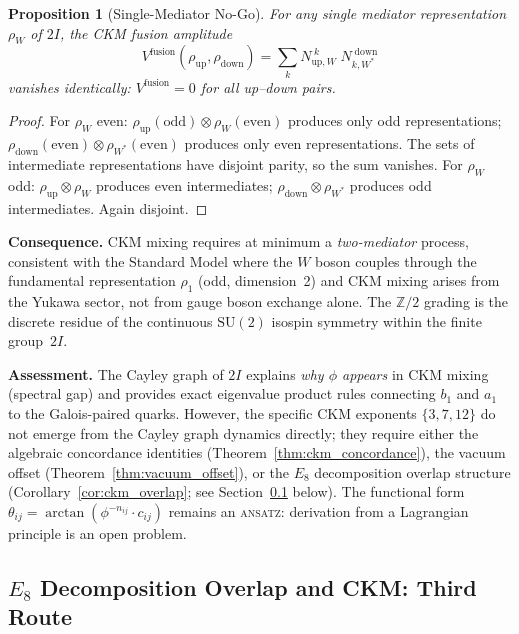 \documentclass[12pt,a4paper]{article}
\newtheorem{proposition}{Proposition}
\theoremstyle{definition}
\begin{document}
\begin{proposition}[Single-Mediator No-Go]
\label{prop:ckm_nogo}
For any single mediator representation $\rho_W$ of $2I$, the CKM fusion amplitude
\[
V^{\text{fusion}}(\rho_{\text{up}}, \rho_{\text{down}}) = \sum_k N_{\text{up},W}^{\;k}\; N_{k,W^*}^{\;\text{down}}
\]
vanishes identically: $V^{\text{fusion}} = 0$ for all up--down pairs.
\end{proposition}
\begin{proof}
For $\rho_W$ even: $\rho_{\text{up}}(\text{odd}) \otimes \rho_W(\text{even})$ produces only odd representations; $\rho_{\text{down}}(\text{even}) \otimes \rho_{W^*}(\text{even})$ produces only even representations.  The sets of intermediate representations have disjoint parity, so the sum vanishes.  For $\rho_W$ odd: $\rho_{\text{up}} \otimes \rho_W$ produces even intermediates; $\rho_{\text{down}} \otimes \rho_{W^*}$ produces odd intermediates.  Again disjoint.
\end{proof}

\textbf{Consequence.}  CKM mixing requires at minimum a \emph{two-mediator} process, consistent with the Standard Model where the $W$ boson couples through the fundamental representation $\rho_1$ (odd, dimension~2) and CKM mixing arises from the Yukawa sector, not from gauge boson exchange alone.  The $\mathbb{Z}/2$ grading is the discrete residue of the continuous $\mathrm{SU}(2)$ isospin symmetry within the finite group~$2I$.

\textbf{Assessment.}  The Cayley graph of $2I$ explains \emph{why $\phi$ appears} in CKM mixing (spectral gap) and provides exact eigenvalue product rules connecting $b_1$ and $a_1$ to the Galois-paired quarks.  However, the specific CKM exponents $\{3, 7, 12\}$ do not emerge from the Cayley graph dynamics directly; they require either the algebraic concordance identities (Theorem~\ref{thm:ckm_concordance}), the vacuum offset (Theorem~\ref{thm:vacuum_offset}), or the $E_8$ decomposition overlap structure (Corollary~\ref{cor:ckm_overlap}; see Section~\ref{sec:S-e8-overlap-ckm} below).  The functional form $\theta_{ij} = \arctan(\phi^{-n_{ij}} \cdot c_{ij})$ remains an \textsc{ansatz}: derivation from a Lagrangian principle is an open problem.

\subsection{$E_8$ Decomposition Overlap and CKM: Third Route}
\label{sec:S-e8-overlap-ckm}
\end{document}
